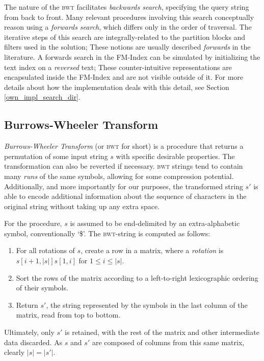 The nature of the \textsc{bwt} facilitates \textit{backwards search}, specifying the query string from back to front. Many relevant procedures involving this search conceptually reason using a \textit{forwards search}, which differs only in the order of traversal. The iterative steps of this search are integrally-related to the partition \glspl{block} and \glspl{filter} used in the \aspop{} solution; These notions are usually described \textit{forwards} in the literature. A forwards search in the FM-Index can be simulated by initializing the text index on a \textit{reversed} text; These counter-intuitive representations are encapsulated inside the FM-Index and are not visible outside of it. For more details about how the implementation deals with this detail, see Section \ref{own_impl_search_dir}.


\subsection{Burrows-Wheeler Transform}
\label{bwt}

\textit{Burrows-Wheeler Transform} (or \textsc{bwt} for short) is a procedure that returns a permutation of some input string $s$ with specific desirable properties. The transformation can also be reverted if necessary. \textsc{bwt} strings tend to contain many \textit{runs} of the same symbols, allowing for some compression potential. Additionally, and more importantly for our purposes, the transformed string $s'$ is able to encode additional information about the sequence of characters in the original string without taking up any extra space.
 
For the procedure, $s$ is assumed to be end-delimited by an extra-alphabetic symbol, conventionally `\$'. The \textsc{bwt}-string is computed as follows:

\begin{enumerate}
\item For all rotations of $s$, create a row in a matrix, where a \textit{rotation} is $s[i+1,|s|]s[1,i]$ for $1\leq{} i \leq{|s|}$.
\item Sort the rows of the matrix according to a left-to-right lexicographic ordering of their symbols.
\item Return $s'$, the string represented by the symbols in the last column of the matrix, read from top to bottom.
\end{enumerate}

Ultimately, only $s'$ is retained, with the rest of the matrix and other intermediate data discarded. As $s$ and $s'$ are composed of columns from this same matrix, clearly $|s|=|s'|$.

